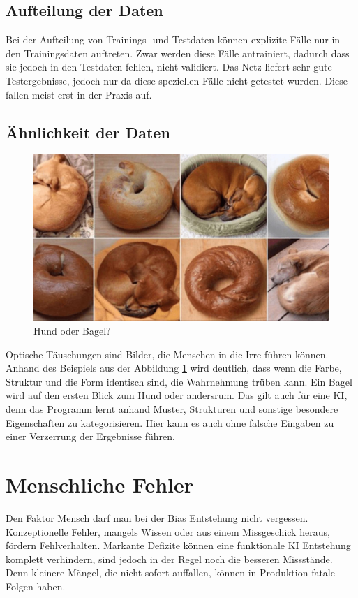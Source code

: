 \documentclass[12pt,oneside,a4paper,parskip]{scrbook}
\begin{document}
\subsection{Aufteilung der Daten}
\label{section:AufteilungDerDaten}
Bei der Aufteilung von Trainings- und Testdaten können explizite Fälle nur in den Trainingsdaten auftreten. Zwar werden diese Fälle antrainiert, dadurch dass sie jedoch in den Testdaten fehlen, nicht validiert. Das Netz liefert sehr gute Testergebnisse, jedoch nur da diese speziellen Fälle nicht getestet wurden. Diese fallen meist erst in der Praxis auf.
\subsection{Ähnlichkeit der Daten}
\label{section:similarData}
\begin{figure}[h]
	\begin{center}
		\includegraphics[width=15cm]{Bilder/dog_or_bagel.jpg}
		\caption{Hund oder Bagel?\cite{dogOrBagel}}
		\label{fig:dogBagel}
	\end{center}
\end{figure}

Optische Täuschungen sind Bilder, die Menschen in die Irre führen können. 
Anhand des Beispiels aus der Abbildung \ref{fig:dogBagel} wird deutlich,
dass wenn die Farbe, Struktur und die Form identisch sind,
die Wahrnehmung trüben kann. Ein Bagel wird auf den ersten Blick zum Hund oder andersrum. 
Das gilt auch für eine KI, denn das Programm lernt anhand Muster, Strukturen und sonstige besondere Eigenschaften zu kategorisieren. Hier kann es auch ohne falsche Eingaben zu einer Verzerrung der Ergebnisse führen.

\section{Menschliche Fehler}
\label{section:humanFehler}
Den Faktor Mensch darf man bei der Bias Entstehung nicht vergessen. Konzeptionelle Fehler, mangels Wissen oder aus einem Missgeschick heraus, fördern Fehlverhalten. Markante Defizite können eine funktionale KI Entstehung komplett verhindern, sind jedoch in der Regel noch die besseren Missstände. Denn kleinere Mängel, die nicht sofort auffallen, können in Produktion fatale Folgen haben. %
\end{document}
